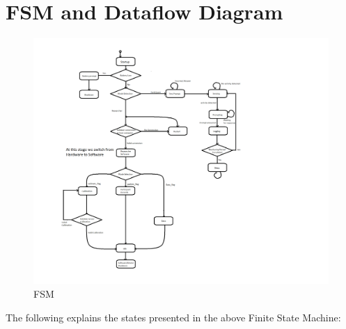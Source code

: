 \documentclass[12pt]{article}
\begin{document}
\section{FSM and Dataflow Diagram}
\begin{figure}[h!]
	\begin{center}
		 \includegraphics[width=1.3\textwidth]{FSM}
		\caption{FSM}
		\label{Fig_FSM} 
	\end{center}
\end{figure}
The following explains the states presented in the above Finite State Machine:
\end{document}
